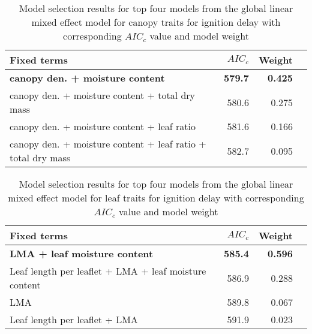 \documentclass{ttuthes2007}
\begin{document}


\begin{table}
  \centering
  \caption{Model selection results for top four models from the global linear
    mixed effect model for canopy traits for ignition delay with corresponding
    $AIC_{c}$ value and model weight}
  \begin{tabular}{lrrr}
    \toprule
    \textbf{Fixed terms} & $AIC_{c}$ & \textbf{Weight}\\
    \midrule
    \textbf{canopy den. + moisture content}    & \textbf{579.7} & \textbf{0.425} \\
    canopy den. + moisture content + total dry mass   & 580.6   & 0.275 \\
    canopy den. + moisture content + leaf ratio       & 581.6   & 0.166  \\
    canopy den. + moisture content + leaf ratio + total dry mass & 582.7  & 0.095 \\
    \bottomrule
  \end{tabular}
  \label{tab:canopy_models_ignition_delay}
\end{table}


\begin{table}
  \centering
  \caption{Model selection results for top four models from the global linear
    mixed effect model for leaf traits for ignition delay with corresponding
    $AIC_{c}$ value and model weight}
  \begin{tabular}{lrrr}
    \toprule
    \textbf{Fixed terms} & $AIC_{c}$ & \textbf{Weight}\\
    \midrule
    \textbf{LMA + leaf moisture content}    & \textbf{585.4} & \textbf{0.596} \\
    Leaf length per leaflet + LMA + leaf moisture content & 586.9          & 0.288          \\
    LMA                                                   & 589.8          & 0.067          \\
    Leaf length per leaflet + LMA                         & 591.9          & 0.023          \\
    \bottomrule
  \end{tabular}
  \label{tab:leaf_models_ignition_delay}
\end{table}
\end{document}
